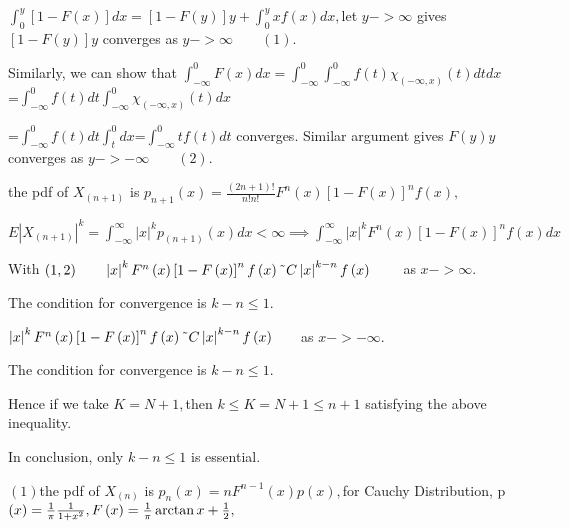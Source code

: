 \documentclass{article}
\begin{document}
$\int_{0}^{y}\left[ 1-F\left( x\right) \right] dx=\left[ 1-F\left( y\right) %
\right] y+\int_{0}^{y}xf\left( x\right) dx,$let $y->\infty $ gives $\left[
1-F\left( y\right) \right] y$ converges as $y->\infty \qquad \left( 1\right) 
$.

Similarly, we can show that $\int_{-\infty }^{0}F\left( x\right)
dx=\int_{-\infty }^{0}\int_{-\infty }^{0}f(t)\chi _{\left( -\infty ,x\right)
}(t)dtdx$=$\int_{-\infty }^{0}f(t)dt\int_{-\infty }^{0}\chi _{\left( -\infty
,x\right) }(t)dx$

=$\int_{-\infty }^{0}f(t)dt\int_{t}^{0}dx$=$\int_{-\infty }^{0}tf(t)dt$
converges. Similar argument gives $F\left( y\right) y$ converges as $%
y->-\infty \qquad \left( 2\right) .$

the pdf of $X_{\left( n+1\right) }$ is $p_{n+1}\left( x\right) =\frac{\left(
2n+1\right) !}{n!n!}F^{n}\left( x\right) \left[ 1-F\left( x\right) \right]
^{n}f\left( x\right) ,$

$E\left\vert X_{\left( n+1\right) }\right\vert ^{k}=\int_{-\infty }^{\infty
}\left\vert x\right\vert ^{k}p_{\left( n+1\right) }\left( x\right) dx<\infty
\implies \int_{-\infty }^{\infty }\left\vert x\right\vert ^{k}F^{n}\left(
x\right) \left[ 1-F\left( x\right) \right] ^{n}f\left( x\right) dx$

\bigskip With $\left( 1,2\right) \qquad \left\vert x\right\vert
^{k}F^{n}\left( x\right) \left[ 1-F\left( x\right) \right] ^{n}f\left(
x\right) \symbol{126}C\left\vert x\right\vert ^{k-n}f\left( x\right) \qquad $%
as $x->\infty .$

The condition for convergence is $k-n\leq 1.$

$\left\vert x\right\vert ^{k}F^{n}\left( x\right) \left[ 1-F\left( x\right) %
\right] ^{n}f\left( x\right) \symbol{126}C\left\vert x\right\vert
^{k-n}f\left( x\right) \qquad $as $x->-\infty .$

The condition for convergence is $k-n\leq 1.$

Hence if we take $K=N+1,$then $k\leq K=N+1\leq n+1$ satisfying the above
inequality.

In conclusion, only  $k-n\leq 1$ is essential.


$\left( 1\right) $the pdf of $X_{\left( n\right) }$ is $p_{n}\left( x\right)
=nF^{n-1}\left( x\right) p\left( x\right) ,$for Cauchy Distribution, p$%
\left( x\right) =\frac{1}{\pi }\frac{1}{1+x^{2}},F\left( x\right) =\frac{1}{%
\pi }\arctan x+\frac{1}{2},$
\end{document}
